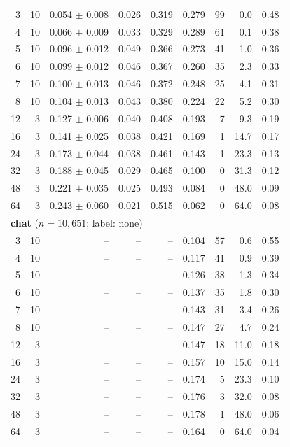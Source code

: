 \begin{longtable}{rrrrrrrrr}
\midrule
3 & 10 & 0.054 $\pm$ 0.008 & 0.026 & 0.319 & 0.279 & 99 & 0.0 & 0.48 \\
4 & 10 & 0.066 $\pm$ 0.009 & 0.033 & 0.329 & 0.289 & 61 & 0.1 & 0.38 \\
5 & 10 & 0.096 $\pm$ 0.012 & 0.049 & 0.366 & 0.273 & 41 & 1.0 & 0.36 \\
6 & 10 & 0.099 $\pm$ 0.012 & 0.046 & 0.367 & 0.260 & 35 & 2.3 & 0.33 \\
7 & 10 & 0.100 $\pm$ 0.013 & 0.046 & 0.372 & 0.248 & 25 & 4.1 & 0.31 \\
8 & 10 & 0.104 $\pm$ 0.013 & 0.043 & 0.380 & 0.224 & 22 & 5.2 & 0.30 \\
12 & 3 & 0.127 $\pm$ 0.006 & 0.040 & 0.408 & 0.193 & 7 & 9.3 & 0.19 \\
16 & 3 & 0.141 $\pm$ 0.025 & 0.038 & 0.421 & 0.169 & 1 & 14.7 & 0.17 \\
24 & 3 & 0.173 $\pm$ 0.044 & 0.038 & 0.461 & 0.143 & 1 & 23.3 & 0.13 \\
32 & 3 & 0.188 $\pm$ 0.045 & 0.029 & 0.465 & 0.100 & 0 & 31.3 & 0.12 \\
48 & 3 & 0.221 $\pm$ 0.035 & 0.025 & 0.493 & 0.084 & 0 & 48.0 & 0.09 \\
64 & 3 & 0.243 $\pm$ 0.060 & 0.021 & 0.515 & 0.062 & 0 & 64.0 & 0.08 \\
\midrule
\multicolumn{9}{l}{\textbf{chat} ($n = 10,651$; label: none)} \\
\midrule
3 & 10 & -- & -- & -- & 0.104 & 57 & 0.6 & 0.55 \\
4 & 10 & -- & -- & -- & 0.117 & 41 & 0.9 & 0.39 \\
5 & 10 & -- & -- & -- & 0.126 & 38 & 1.3 & 0.34 \\
6 & 10 & -- & -- & -- & 0.137 & 35 & 1.8 & 0.30 \\
7 & 10 & -- & -- & -- & 0.143 & 31 & 3.4 & 0.26 \\
8 & 10 & -- & -- & -- & 0.147 & 27 & 4.7 & 0.24 \\
12 & 3 & -- & -- & -- & 0.147 & 18 & 11.0 & 0.18 \\
16 & 3 & -- & -- & -- & 0.157 & 10 & 15.0 & 0.14 \\
24 & 3 & -- & -- & -- & 0.174 & 5 & 23.3 & 0.10 \\
32 & 3 & -- & -- & -- & 0.176 & 3 & 32.0 & 0.08 \\
48 & 3 & -- & -- & -- & 0.178 & 1 & 48.0 & 0.06 \\
64 & 3 & -- & -- & -- & 0.164 & 0 & 64.0 & 0.04 \\
\bottomrule
\end{longtable}
